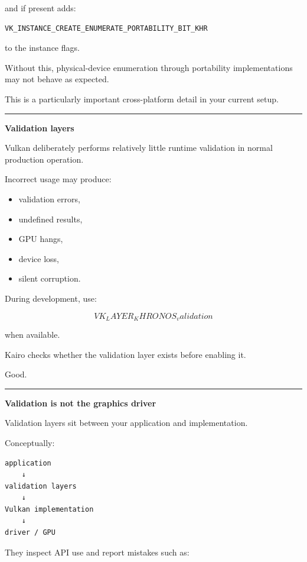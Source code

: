 and if present adds:

\begin{verbatim}
VK_INSTANCE_CREATE_ENUMERATE_PORTABILITY_BIT_KHR
\end{verbatim}

to the instance flags.

Without this, physical-device enumeration through portability implementations may not behave as expected.

This is a particularly important cross-platform detail in your current setup.

\begin{center}\rule{0.5\linewidth}{0.5pt}\end{center}

\textbf{Validation layers}

Vulkan deliberately performs relatively little runtime validation in normal production operation.

Incorrect usage may produce:

\begin{itemize}
\tightlist
\item
  validation errors,
\item
  undefined results,
\item
  GPU hangs,
\item
  device loss,
\item
  silent corruption.
\end{itemize}

During development, use:

\[
\boxed{
VK_LAYER_KHRONOS_validation
}
\]

when available.

Kairo checks whether the validation layer exists before enabling it.

Good.

\begin{center}\rule{0.5\linewidth}{0.5pt}\end{center}

\textbf{Validation is not the graphics driver}

Validation layers sit between your application and implementation.

Conceptually:

\begin{verbatim}
application
    ↓
validation layers
    ↓
Vulkan implementation
    ↓
driver / GPU
\end{verbatim}

They inspect API use and report mistakes such as:

